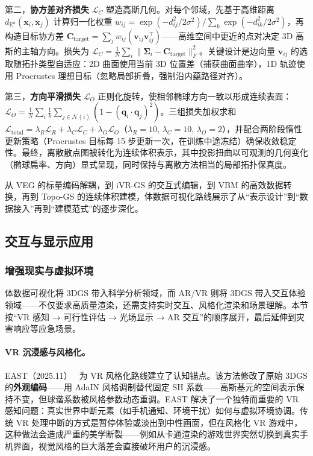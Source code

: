 第二，\textbf{协方差对齐损失} $\mathcal{L}_C$ 塑造高斯几何。对每个邻域，先基于高维距离 $d_{\mathbb{R}^n}(\mathbf{x}_i, \mathbf{x}_j)$ 计算归一化权重 $w_{ij} = \exp(-d_{ij}^2 / 2\sigma^2) / \sum_{k} \exp(-d_{ik}^2 / 2\sigma^2)$，再构造目标协方差 $\mathbf{C}_{\mathrm{target}} = \sum_j w_{ij} (\mathbf{v}_{ij}\mathbf{v}_{ij}^\top)$——高维空间中更近的点对决定 3D 高斯的主轴方向。损失为 $\mathcal{L}_C = \frac{1}{N} \sum_i \|\boldsymbol{\Sigma}_i - \mathbf{C}_{\mathrm{target}}\|_F^2$。关键设计是边向量 $\mathbf{v}_{ij}$ 的选取随拓扑类型自适应：2D 曲面使用当前 3D 位置差（捕获曲面曲率），1D 轨迹使用 Procrustes 理想目标（忽略局部折叠，强制沿内蕴路径对齐）。

第三，\textbf{方向平滑损失} $\mathcal{L}_O$ 正则化旋转，使相邻椭球方向一致以形成连续表面：$\mathcal{L}_O = \frac{1}{N} \sum_i \frac{1}{k} \sum_{j \in \mathcal{N}(i)} (1 - (\mathbf{q}_i \cdot \mathbf{q}_j)^2)$。三组损失加权求和 $\mathcal{L}_{\mathrm{total}} = \lambda_R \mathcal{L}_R + \lambda_C \mathcal{L}_C + \lambda_O \mathcal{L}_O$（$\lambda_R{=}10$, $\lambda_C{=}10$, $\lambda_O{=}2$），并配合两阶段惰性更新策略（Procrustes 目标每 15 步更新一次，在训练中途冻结）确保收敛稳定性。最终，离散散点图被转化为连续体积表示，其中投影扭曲以可观测的几何变化（椭球扁率、方向）显式呈现，同时保持与离散方法相当的局部拓扑保真度。

从 VEG 的标量编码解耦，到 iVR-GS 的交互式编辑，到 VBM 的高效数据转换，再到 Topo-GS 的连续体积建模，体数据可视化路线展示了从“表示设计”到“数据接入”再到“建模范式”的逐步深化。

\subsection{交互与显示应用}

\subsubsection{增强现实与虚拟环境}

体数据可视化将 3DGS 带入科学分析领域，而 AR/VR 则将 3DGS 带入交互体验领域——不仅要求高质量渲染，还需支持实时交互、风格化渲染和场景理解。本节按“VR 感知 → 可行性评估 → 光场显示 → AR 交互”的顺序展开，最后延伸到灾害响应等应急场景。

\paragraph{VR 沉浸感与风格化。}

EAST（2025.11）~\cite{2511_22056} 为 VR 风格化路线建立了认知锚点。该方法修改了原始 3DGS 的\textbf{外观编码}——用 AdaIN 风格调制替代固定 SH 系数——高斯基元的空间表示保持不变，但球谐系数被风格参数动态重调。EAST 解决了一个独特而重要的 VR 感知问题：真实世界中断元素（如手机通知、环境干扰）如何与虚拟环境协调。传统 VR 处理中断的方式是暂停体验或淡出到中性画面，但在风格化 VR 游戏中，这种做法会造成严重的美学断裂——例如从卡通渲染的游戏世界突然切换到真实手机界面，视觉风格的巨大落差会直接破坏用户的沉浸感。


